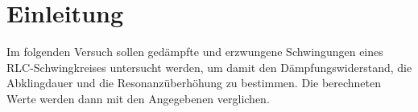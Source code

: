 \section{Einleitung}
\label{sec:einleitung}
Im folgenden Versuch sollen gedämpfte und erzwungene Schwingungen eines RLC-Schwingkreises untersucht werden, um damit den 
Dämpfungswiderstand, die Abklingdauer und die Resonanzüberhöhung zu bestimmen. Die berechneten Werte werden dann mit den
Angegebenen verglichen. 